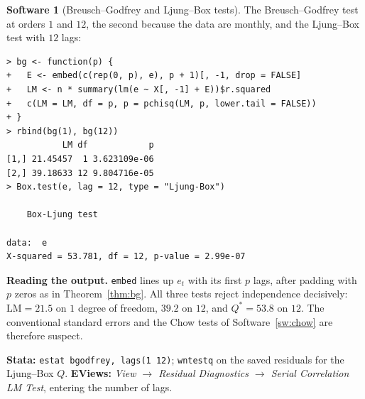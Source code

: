 \documentclass[11pt,a4paper]{article}
\numberwithin{equation}{section}
\theoremstyle{definition}
\newtheorem{software}[thm]{Software}
\begin{document}
\begin{software}[Breusch--Godfrey and Ljung--Box tests]
\label{sw:bg}
The Breusch--Godfrey test at orders $1$ and $12$, the second because the data are monthly, and the Ljung--Box test with $12$ lags:
{\small\begin{verbatim}
> bg <- function(p) {
+   E <- embed(c(rep(0, p), e), p + 1)[, -1, drop = FALSE]
+   LM <- n * summary(lm(e ~ X[, -1] + E))$r.squared
+   c(LM = LM, df = p, p = pchisq(LM, p, lower.tail = FALSE))
+ }
> rbind(bg(1), bg(12))
           LM df            p
[1,] 21.45457  1 3.623109e-06
[2,] 39.18633 12 9.804716e-05
> Box.test(e, lag = 12, type = "Ljung-Box")

    Box-Ljung test

data:  e
X-squared = 53.781, df = 12, p-value = 2.99e-07
\end{verbatim}}
\textbf{Reading the output.} \texttt{embed} lines up $e_t$ with its first $p$ lags, after padding with $p$ zeros as in Theorem~\ref{thm:bg}. All three
tests reject independence decisively: $\text{LM} = 21.5$ on $1$ degree of freedom, $39.2$ on $12$, and $Q^* = 53.8$ on $12$. The conventional standard errors and the
Chow tests of Software~\ref{sw:chow} are therefore suspect.

\textbf{Stata:} \texttt{estat bgodfrey, lags(1 12)}; \texttt{wntestq} on the saved residuals for the Ljung--Box $Q$. \textbf{EViews:} \emph{View $\to$
Residual Diagnostics $\to$ Serial Correlation LM Test}, entering the number of lags.
\end{software}
\end{document}
